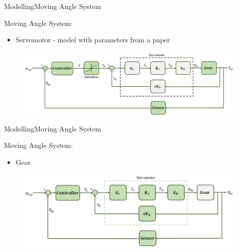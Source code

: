 \begin{frame}{Modelling}{Moving Angle System}
  \begin{block}{Moving Angle System:}

	  \begin{itemize}
	  	\item Servomotor - model with parameters from a paper
	  \end{itemize}

	  \begin{figure}
        \includegraphics[scale=0.24]{../report/figures/servo+gear+noise+servomotor.png}
      \end{figure}
  
  \end{block}
\end{frame}

\begin{frame}{Modelling}{Moving Angle System}
  \begin{block}{Moving Angle System:}
	  \begin{itemize}
	  	\item Gear
	  \end{itemize}
	  \begin{figure}
        \includegraphics[scale=0.24]{../report/figures/servo+gear+noise+gear.png}
      \end{figure}  
  \end{block}
\end{frame}

